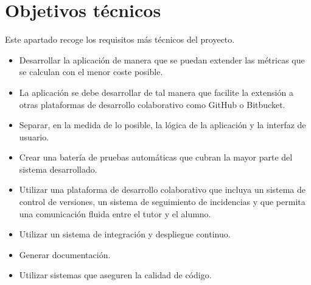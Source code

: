 \section{Objetivos técnicos}
Este apartado recoge los requisitos más técnicos del proyecto.
\begin{itemize}
	\item Desarrollar la aplicación de manera que se puedan extender las métricas que se calculan con el menor coste posible.
	\item La aplicación se debe desarrollar de tal manera que facilite la extensión a otras plataformas de desarrollo colaborativo como GitHub o Bitbucket.
	\item Separar, en la medida de lo posible, la lógica de la aplicación y la interfaz de usuario.
	\item Crear una batería de pruebas automáticas que cubran la mayor parte del sistema desarrollado.
	\item Utilizar una plataforma de desarrollo colaborativo que incluya un sistema de control de versiones, un sistema de seguimiento de incidencias y que permita una comunicación fluida entre el tutor y el alumno.
	\item Utilizar un sistema de integración y despliegue continuo.
	\item Generar documentación.
	\item Utilizar sistemas que aseguren la calidad de código.
\end{itemize}
